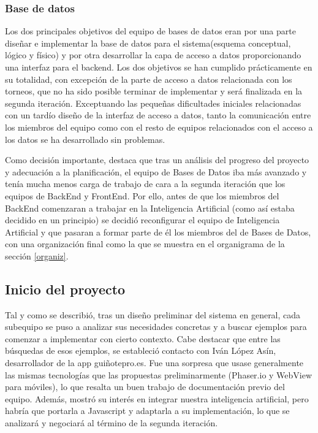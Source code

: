 \subsubsection*{Base de datos}
Los dos principales objetivos del equipo de bases de datos eran por una parte diseñar e implementar la base de datos para el sistema(esquema conceptual, lógico y físico) y por otra desarrollar la capa de acceso a datos proporcionando una interfaz para el backend. Los dos objetivos se han cumplido prácticamente en su totalidad, con excepción de la parte de acceso a datos relacionada con los torneos, que no ha sido posible terminar de implementar y será finalizada en la segunda iteración. Exceptuando las pequeñas dificultades iniciales relacionadas con un tardío diseño de la interfaz de acceso a datos, tanto la comunicación entre los miembros del equipo como con el resto de equipos relacionados con el acceso a los datos se ha desarrollado sin problemas.

Como decisión importante, destaca que tras un análisis del progreso del proyecto y adecuación a la planificación, el equipo de Bases de Datos iba más avanzado y tenía mucha menos carga de trabajo de cara a la segunda iteración que los equipos de BackEnd y FrontEnd. Por ello, antes de que los miembros del BackEnd comenzaran a trabajar en la Inteligencia Artificial (como así estaba decidido en un principio) se decidió reconfigurar el equipo de Inteligencia Artificial y que pasaran a formar parte de él los miembros del de Bases de Datos, con una organización final como la que se muestra en el organigrama de la sección \ref{organiz}.

\subsection{Inicio del proyecto}
\label{Inicio del proyecto}
Tal y como se describió, tras un diseño preliminar del sistema en general, cada subequipo se puso a analizar sus necesidades concretas y a buscar ejemplos para comenzar a implementar con cierto contexto. Cabe destacar que entre las búsquedas de esos ejemplos, se estableció contacto con Iván López Asín, desarrollador de la app guiñotepro.es. Fue una sorpresa que usase generalmente las mismas tecnologías que las propuestas preliminarmente (Phaser.io y WebView para móviles), lo que resalta un buen trabajo de documentación previo del equipo. Además, mostró su interés en integrar nuestra  inteligencia artificial, pero habría que portarla a Javascript y adaptarla a su implementación, lo que se analizará y negociará al término de la segunda iteración.\\

